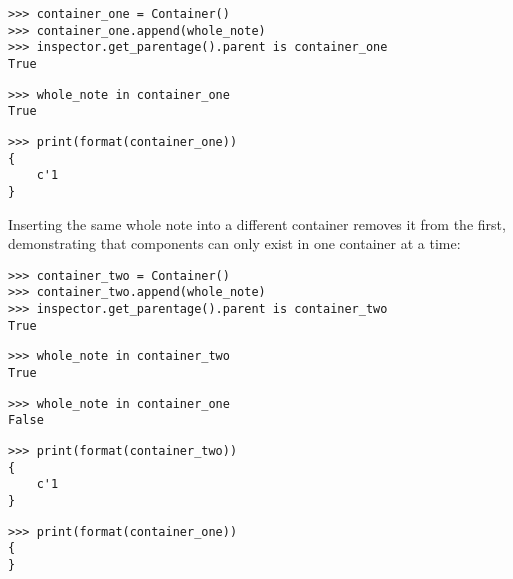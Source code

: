 \begin{comment}
<abjad>
container_one = Container()
container_one.append(whole_note)
inspector.get_parentage().parent is container_one
whole_note in container_one
print(format(container_one))
</abjad>
\end{comment}

\begin{abjadbookoutput}
\begin{singlespacing}
\vspace{-0.5\baselineskip}
\begin{lstlisting}
>>> container_one = Container()
>>> container_one.append(whole_note)
>>> inspector.get_parentage().parent is container_one
True
\end{lstlisting}
\begin{lstlisting}
>>> whole_note in container_one
True
\end{lstlisting}
\begin{lstlisting}
>>> print(format(container_one))
{
    c'1
}
\end{lstlisting}
\end{singlespacing}
\end{abjadbookoutput}

Inserting the same whole note into a different container removes it from the
first, demonstrating that components can only exist in one container at a time:

\begin{comment}
<abjad>
container_two = Container()
container_two.append(whole_note)
inspector.get_parentage().parent is container_two
whole_note in container_two
whole_note in container_one
print(format(container_two))
print(format(container_one))
</abjad>
\end{comment}

\begin{abjadbookoutput}
\begin{singlespacing}
\vspace{-0.5\baselineskip}
\begin{lstlisting}
>>> container_two = Container()
>>> container_two.append(whole_note)
>>> inspector.get_parentage().parent is container_two
True
\end{lstlisting}
\begin{lstlisting}
>>> whole_note in container_two
True
\end{lstlisting}
\begin{lstlisting}
>>> whole_note in container_one
False
\end{lstlisting}
\begin{lstlisting}
>>> print(format(container_two))
{
    c'1
}
\end{lstlisting}
\begin{lstlisting}
>>> print(format(container_one))
{
}
\end{lstlisting}
\end{singlespacing}
\end{abjadbookoutput}

